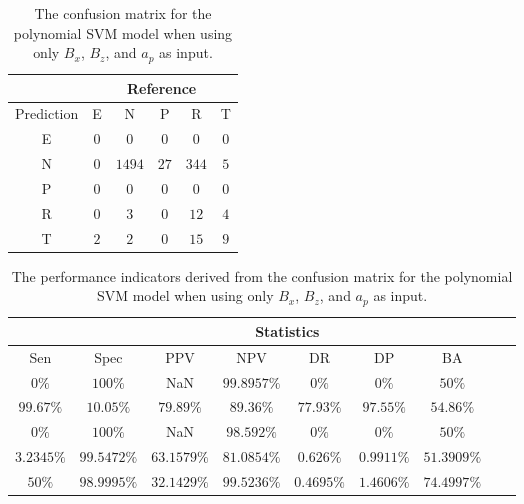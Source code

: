 \begin{table}[!ht]
	\centering
	\begin{tabular}{|c|c|c|c|c|c|}
		\hline
		 & \multicolumn{5}{|c|}{Reference} \\ \hline
		 Prediction & E & N & P & R & T \\ \hline
		 E & $0$ & $0$ & $0$ & $0$ & $0$ \\ \hline
		 N & $0$ & $1494$ & $27$ & $344$ & $5$ \\ \hline
		 P & $0$ & $0$ & $0$ & $0$ & $0$ \\ \hline
		 R & $0$ & $3$ & $0$ & $12$ & $4$ \\ \hline
		 T & $2$ & $2$ & $0$ & $15$ & $9$ \\ \hline
	\end{tabular}
	\caption{The confusion matrix for the polynomial SVM model when using only $B_{x}$, $B_{z}$, and $a_{p}$ as input.}
	\label{tab:cm:xzap:svmPoly}
\end{table}

\begin{table}[!ht]
	\centering
	\begin{tabular}{|c|c|c|c|c|c|c|c|c|}
		\hline
		 & \multicolumn{7}{c|}{Statistics} \\ \hline
		Sen & Spec & PPV & NPV & DR & DP & BA \\ \hline
		$0\%$ & $100\%$ & NaN & $99.8957\%$ & $0\%$ & $0\%$ & $50\%$ \\ \hline
		$99.67\%$ & $10.05\%$ & $79.89\%$ & $89.36\%$ & $77.93\%$ & $97.55\%$ & $54.86\%$ \\ \hline
		$0\%$ & $100\%$ & NaN & $98.592\%$ & $0\%$ & $0\%$ & $50\%$ \\ \hline
		$3.2345\%$ & $99.5472\%$ & $63.1579\%$ & $81.0854\%$ & $0.626\%$ & $0.9911\%$ & $51.3909\%$ \\ \hline
		$50\%$ & $98.9995\%$ & $32.1429\%$ & $99.5236\%$ & $0.4695\%$ & $1.4606\%$ & $74.4997\%$ \\ \hline
	\end{tabular}
	\caption{The performance indicators derived from the confusion matrix for the polynomial SVM model when using only $B_{x}$, $B_{z}$, and $a_{p}$ as input.}
	\label{tab:cs:xzap:svmPoly}
\end{table}

